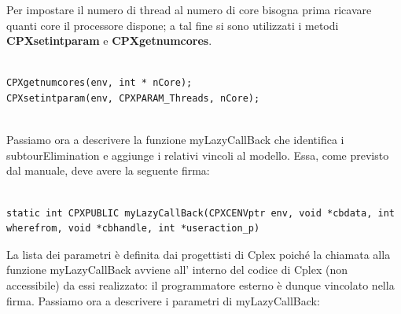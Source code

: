 \documentclass[11pt]{article}
\begin{document}
Per impostare il numero di thread al numero di core bisogna prima ricavare quanti core il processore dispone; a tal fine si sono utilizzati i metodi \textbf{CPXsetintparam} e \textbf{CPXgetnumcores}.

\begin{lstlisting}

CPXgetnumcores(env, int * nCore);
CPXsetintparam(env, CPXPARAM_Threads, nCore);


\end{lstlisting}


Passiamo ora a descrivere la funzione myLazyCallBack che identifica i subtourElimination e aggiunge i relativi vincoli al modello. Essa, come previsto dal manuale, deve avere la seguente firma:


\begin{lstlisting}

static int CPXPUBLIC myLazyCallBack(CPXCENVptr env, void *cbdata, int wherefrom, void *cbhandle, int *useraction_p)

\end{lstlisting}


La lista dei parametri è definita dai progettisti di Cplex poiché la chiamata alla funzione myLazyCallBack avviene all’ interno del codice di Cplex (non accessibile) da essi realizzato: il programmatore esterno è dunque vincolato nella firma. Passiamo ora a descrivere i parametri di myLazyCallBack:
\end{document}
